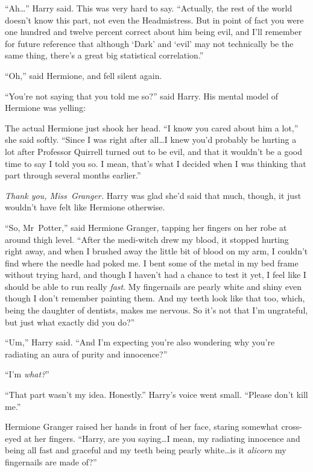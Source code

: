 “Ah…” Harry said. This was very hard to say. “Actually, the rest of the world doesn’t know this part, not even the Headmistress. But in point of fact you were one hundred and twelve percent correct about him being evil, and I’ll remember for future reference that although ‘Dark’ and ‘evil’ may not technically be the same thing, there’s a great big statistical correlation.”

“Oh,” said Hermione, and fell silent again.

“You’re not saying that you told me so?” said Harry. His mental model of Hermione was yelling: 

The actual Hermione just shook her head. “I know you cared about him a lot,” she said softly. “Since I was right after all…I knew you’d probably be hurting a lot after Professor Quirrell turned out to be evil, and that it wouldn’t be a good time to say I told you so. I mean, that’s what I decided when I was thinking that part through several months earlier.”

\emph{Thank you, Miss~Granger.} Harry was glad she’d said that much, though, it just wouldn’t have felt like Hermione otherwise.

“So, Mr~Potter,” said Hermione Granger, tapping her fingers on her robe at around thigh level. “After the medi-witch drew my blood, it stopped hurting right away, and when I brushed away the little bit of blood on my arm, I couldn’t find where the needle had poked me. I bent some of the metal in my bed frame without trying hard, and though I haven’t had a chance to test it yet, I feel like I should be able to run really \emph{fast}. My fingernails are pearly white and shiny even though I don’t remember painting them. And my teeth look like that too, which, being the daughter of dentists, makes me nervous. So it’s not that I’m ungrateful, but just what exactly did you do?”

“Um,” Harry said. “And I’m expecting you’re also wondering why you’re radiating an aura of purity and innocence?”

“I’m \emph{what?}”

“That part wasn’t my idea. Honestly.” Harry’s voice went small. “Please don’t kill me.”

Hermione Granger raised her hands in front of her face, staring somewhat cross-eyed at her fingers. “Harry, are you saying…I mean, my radiating innocence and being all fast and graceful and my teeth being pearly white…is it \emph{alicorn} my fingernails are made of?”

